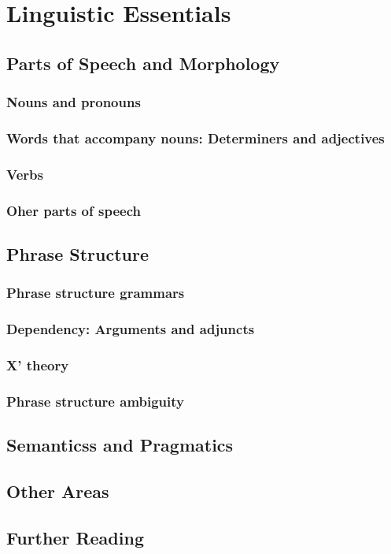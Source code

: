 \documentclass[a4paper]{article}
\begin{document}
\section{Linguistic Essentials}
\subsection{Parts of Speech and Morphology}
\subsubsection{Nouns and pronouns}
\subsubsection{Words that accompany nouns: Determiners and adjectives}
\subsubsection{Verbs}
\subsubsection{Oher parts of speech}
\subsection{Phrase Structure}
\subsubsection{Phrase structure grammars}
\subsubsection{Dependency: Arguments and adjuncts}
\subsubsection{X' theory}
\subsubsection{Phrase structure ambiguity}
\subsection{Semanticss and Pragmatics}
\subsection{Other Areas}
\subsection{Further Reading}
\end{document}
